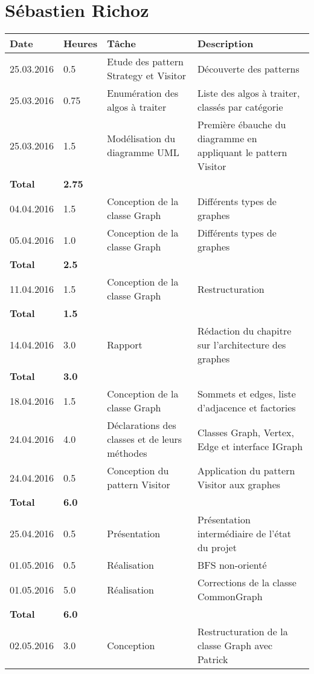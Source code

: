 \documentclass[french]{article}
\begin{document}
	\section*{Sébastien Richoz}
	\begin{longtable}{p{}|p{}|p{}|p{}}
		Date&Heures&Tâche&Description\\
		\hline \hline
		25.03.2016 & 0.5 &Etude des pattern Strategy et Visitor&Découverte des patterns\\
		25.03.2016 & 0.75&Enumération des algos à traiter&Liste des algos à traiter, classés par catégorie\\
		25.03.2016 & 1.5 &Modélisation du diagramme UML&Première ébauche du diagramme en appliquant le pattern Visitor\\
		\textbf{Total} & \textbf{2.75} &&\\
		\hline
		04.04.2016 & 1.5 &Conception de la classe Graph&Différents types de graphes\\
		05.04.2016 & 1.0 &Conception de la classe Graph&Différents types de graphes\\
		\textbf{Total} & \textbf{2.5} &&\\
		\hline
		11.04.2016 & 1.5 &Conception de la classe Graph&Restructuration\\
		\textbf{Total} & \textbf{1.5} &&\\
		\hline
		14.04.2016 & 3.0 &Rapport&Rédaction du chapitre sur l'architecture des graphes\\
		\textbf{Total} & \textbf{3.0} &&\\
		\hline
		18.04.2016 & 1.5 &Conception de la classe Graph&Sommets et edges, liste d'adjacence et factories\\
		24.04.2016 & 4.0 &Déclarations des classes et de leurs méthodes&Classes Graph, Vertex, Edge et interface IGraph\\
		24.04.2016 & 0.5 &Conception du pattern Visitor&Application du pattern Visitor aux graphes\\
		\textbf{Total} & \textbf{6.0} &&\\
		\hline
		25.04.2016 & 0.5 & Présentation & Présentation intermédiaire de l'état du projet\\
		01.05.2016 & 0.5 & Réalisation & BFS non-orienté\\
		01.05.2016 & 5.0 & Réalisation & Corrections de la classe CommonGraph\\
		\textbf{Total} & \textbf{6.0} &&\\
		\hline
		02.05.2016 & 3.0 & Conception & Restructuration de la classe Graph avec Patrick\\

\end{longtable}
\end{document}
